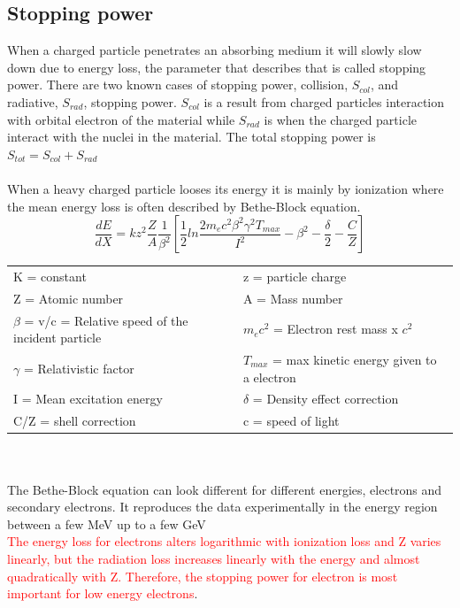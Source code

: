 \documentclass[twoside,english]{uiofysmaster/uiofysmaster}
\begin{document}
\subsection{Stopping power}
When a charged particle penetrates an absorbing medium it will slowly slow down due to energy loss, the parameter that describes that is called stopping power. There are two known cases of stopping power\cite{Nuclear_medicine}, collision, $S_{col}$, and radiative, $S_{rad}$, stopping power. $S_{col}$ is a result from charged particles interaction with orbital electron of the material while $S_{rad}$ is when the charged particle interact with the nuclei in the material. The total stopping power is $S_{tot} = S_{col} + S_{rad}$ \\
\\
When a heavy charged particle looses its energy it is mainly by ionization where the mean energy loss is often described by Bethe-Block equation\cite{nuclearchem}.
\begin{equation}
    \frac{dE}{dX} = kz^2 \frac{Z}{A} \frac{1}{\beta^2} \left[ \frac{1}{2}ln \frac{2m_e c^2 \beta^2 \gamma^2 T_{max}}{I^2} - \beta^2 - \frac{\delta}{2} - \frac{C}{Z} \right]
\end{equation}
\begin{tabular}{l|l}
     K = constant & z = particle charge  \\
     Z = Atomic number & A = Mass number \\
     $\beta$ = v/c = Relative speed of the incident particle & $m_e c^2$ = Electron rest mass x $c^2$ \\
     $\gamma$ = Relativistic factor & $T_{max}$ = max kinetic energy given to a electron \\
     I = Mean excitation energy & $\delta$ = Density effect correction \\
     C/Z = shell correction & c = speed of light\\
\end{tabular}
\\
\\
The Bethe-Block equation can look different for different energies, electrons and secondary electrons. It reproduces the data experimentally in the energy region between a few MeV up to a few GeV\cite{nuclearchem} \\
\textcolor{red}{ The energy loss for electrons alters logarithmic with ionization loss and Z varies linearly, but the radiation loss increases linearly with the energy and almost quadratically with Z. Therefore, the stopping power for electron is most important for low energy electrons}\cite{nuclearchem}.\\
\end{document}
